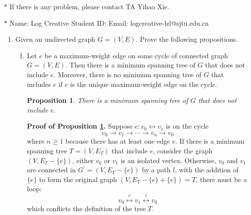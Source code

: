 \documentclass[12pt,a4paper]{article}
\newtheorem{proposition}[theorem]{Proposition}
\theoremstyle{definition}
\begin{document}
\noindent

\noindent{}
\begin{center}
\footnotesize{\color{red}$*$ If there is any problem, please contact TA Yihao Xie. }

\footnotesize{\color{blue}$*$ Name: Log Creative  \quad Student ID:  \quad Email: logcreative-lzl@sjtu.edu.cn}
\end{center}

\begin{enumerate}

	\item Given an undirected graph $G = (V, E)$. Prove the following propositions.
	
	\begin{enumerate}
		\item Let $e$ be a maximum-weight edge on some cycle of connected graph $G=(V,E)$.
        Then there is a minimum spanning tree of $G$ that does not include $e$. Moreover, there is no minimum spanning tree of $G$ that includes $e$ if $e$ is the unique maximum-weight edge on the cycle. 
            \begin{proposition}\label{prop:ni}
                There is a minimum spanning tree of $G$ that does not include $e$.
            \end{proposition}
            \textbf{Proof of Proposition \ref{prop:ni}.} Suppose $e:v_0\leftrightarrow v_1$ is on the cycle 
            \begin{equation*}
                v_0\rightarrow v_1\rightarrow \cdots\rightarrow v_n\rightarrow v_0
            \end{equation*}
            where $n\geq 1$ because there has at least one edge $e$. If there is a minimum spanning tree $T=(V,E_T)$ that include $e$, consider the graph $(V,E_T-\{e\})$, either $v_0$ or $v_1$ is an isolated vertex. Otherwise, $v_0$ and $v_1$ are connected in $G^\prime =(V,E_T-\{e\})$ by a path $l$, with the addition of $\{e\}$ to form the original graph $(V,E_T-\{e\}+\{e\})=T$, there must be a loop:
            \begin{equation*}
                v_0 \stackrel{e}{\longleftrightarrow} v_{1} \stackrel{l}{\longleftrightarrow} v_0
            \end{equation*}
            which conflicts the definition of the tree $T$.


\end{enumerate}
\end{enumerate}
\end{document}
